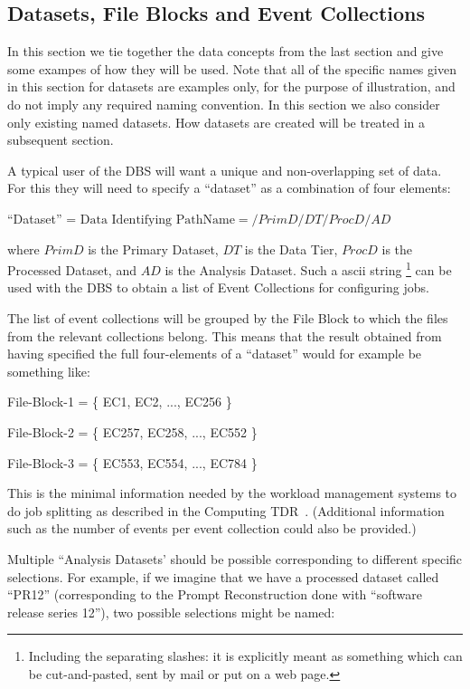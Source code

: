\documentclass[pdftex]{cmspaper}
\begin{document}
\subsection{Datasets, File Blocks and Event Collections}

  In this section we tie together the data concepts from the last section
and give some exampes of how they will be used. Note that all of the specific
names given in this section for datasets are examples only, for the purpose
of illustration, and do not imply any required naming convention. In this
section we also consider only existing named datasets. How datasets are 
created will be treated in a subsequent section.

  A typical user of the DBS will want a unique and non-overlapping set of 
data. For this they will need to specify a ``dataset'' as a combination
of four elements:
\begin{center}
  \mbox{``Dataset''} = $\mbox{Data Identifying PathName} = /PrimD/DT/ProcD/AD$
\end{center}
where $PrimD$ is the Primary Dataset, $DT$ is the Data Tier, $ProcD$ is the 
Processed Dataset, and $AD$ is the Analysis Dataset. Such a ascii string
\footnote{Including the separating slashes: it is explicitly meant as something
which can be cut-and-pasted, sent by mail or put on a web page.} can be used 
with the DBS to obtain a list of Event Collections for configuring jobs. 

  The list of event collections will be grouped by the File Block to which
the files from the relevant collections belong. This means that the result 
obtained from having specified the full four-elements of a ``dataset'' would 
for example be something like:
\begin{flushleft}
\mbox{File-Block-1} = \{ \mbox{EC1}, \mbox{EC2}, ..., EC256 \}
\end{flushleft}
\begin{flushleft}
\mbox{File-Block-2} = \{ \mbox{EC257}, \mbox{EC258}, ..., \mbox{EC552} \}
\end{flushleft}
\begin{flushleft}
\mbox{File-Block-3} = \{ \mbox{EC553}, \mbox{EC554}, ..., \mbox{EC784} \}
\end{flushleft}
This is the minimal information needed by the workload management systems to 
do job splitting as described in the Computing TDR~\cite{CTDR}. (Additional
information such as the number of events per event collection could also
be provided.)

  Multiple ``Analysis Datasets' should be possible corresponding to different
specific selections. For example, if we imagine that we have a processed
dataset called ``PR12'' (corresponding to the Prompt Reconstruction done 
with ``software release series 12''), two possible selections might be named:
\end{document}
